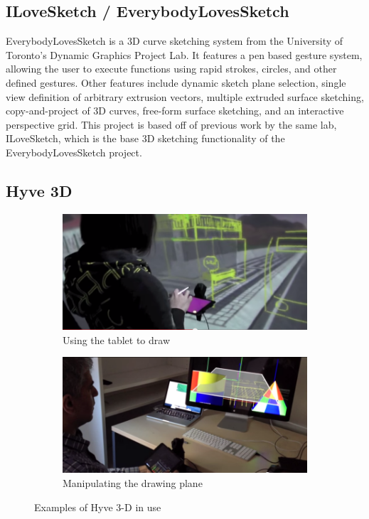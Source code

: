 \documentclass[12pt]{report}
\begin{document}
\subsection{ILoveSketch / EverybodyLovesSketch}

EverybodyLovesSketch is a 3D curve sketching system from the University of Toronto's Dynamic Graphics Project Lab. It features a pen based gesture system, allowing the user to execute functions using rapid strokes, circles, and other defined gestures. Other features include dynamic sketch plane selection, single view definition of arbitrary extrusion vectors, multiple extruded surface sketching, copy-and-project of 3D curves, free-form surface sketching, and an interactive perspective grid. This project is based off of previous work by the same lab, ILoveSketch, which is the base 3D sketching functionality of the EverybodyLovesSketch project.

\subsection{Hyve 3D}

\begin{figure}

\begin{subfigure}{\textwidth}
\includegraphics[width=0.9\linewidth]{Hyve3D1}
\caption{Using the tablet to draw}
\end{subfigure}
\begin{subfigure}{\textwidth}
\includegraphics[width=0.9\linewidth]{Hyve3D2}
\caption{Manipulating the drawing plane}
\end{subfigure}

\caption{Examples of Hyve 3-D in use}
\end{figure}
\end{document}
